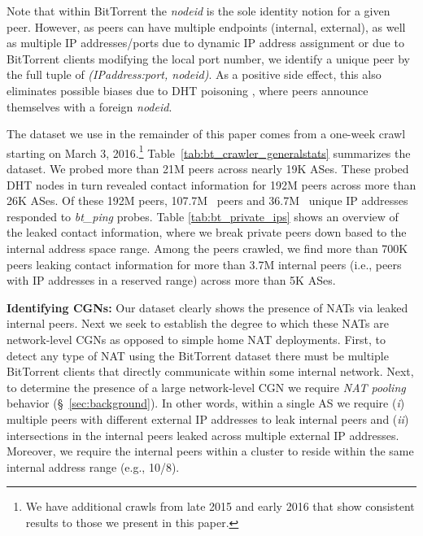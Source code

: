 \documentclass[10pt]{sig-alternate-05-2015}
\newcommand\xref[1]{\S~\ref{#1}}
\newcommand{\parax}[1]{\vspace{0.2em} \noindent \textbf{#1:}}
\def\first{({\it i})\xspace}
\def\second{({\it ii})\xspace}
\newcommand{\btping}{\textit{bt\_ping}\xspace}
\newcommand{\btnodeid}{\textit{nodeid}\xspace}
\begin{document}
Note that within BitTorrent the \btnodeid is the sole identity notion for a 
given peer.  However, as peers can have multiple endpoints (internal, 
external), as well as multiple IP addresses/ports due to dynamic IP address 
assignment or due to BitTorrent clients modifying the local port number, we 
identify a unique peer by the full tuple of \textit{(IPaddress:port, nodeid)}.
As a positive side effect, this also eliminates possible biases due
to DHT poisoning \cite{wang2012real}, where peers announce themselves with 
a foreign \btnodeid.

The dataset we use in the remainder of this paper comes from a one-week crawl 
starting on March 3, 2016.\footnote{We have additional crawls from late 2015 
and early 2016 that show  consistent results to those we present in this paper.}
Table~\ref{tab:bt_crawler_generalstats} summarizes the dataset.  We
probed more than 21M peers across nearly 19K ASes.  These probed DHT
nodes in turn revealed contact information for 192M peers across
more than 26K ASes.  Of these 192M peers, 107.7M~
peers and 36.7M~ unique IP addresses responded to
\btping probes. Table \ref{tab:bt_private_ips} shows an overview of the leaked 
contact information, where we break private peers down based to the internal 
address space range. Among the peers crawled, we find more than 700K peers 
leaking contact information for more than 3.7M internal peers (i.e., peers with 
IP addresses in a reserved range) across more than 5K ASes.





\parax{Identifying CGNs}
Our dataset clearly shows the presence of NATs via leaked internal
peers.  Next we seek to establish the degree to which these NATs are
network-level CGNs as opposed to simple home NAT deployments.
First, to detect any type of NAT using the BitTorrent dataset there
must be multiple BitTorrent clients that directly communicate within
some internal network.  Next, to determine the presence of a large
network-level CGN we require \textit{NAT pooling} behavior
(\xref{sec:background}).  In other words, within a single AS we
require \first multiple peers with different external IP addresses
to leak internal peers and \second intersections in the internal
peers leaked across multiple external IP addresses. Moreover, we require the 
internal peers within a cluster to reside within the same internal address 
range (e.g., 10/8).
\end{document}
